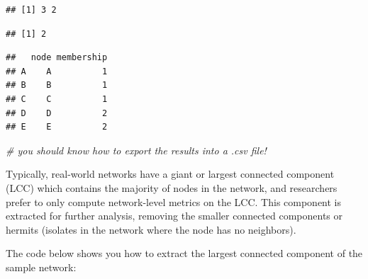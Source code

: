 \documentclass[
]{book}
\newenvironment{Shaded}{\begin{snugshade}}{\end{snugshade}}
\newcommand{\AttributeTok}[1]{\textcolor[rgb]{0.13,0.29,0.53}{#1}}
\newcommand{\CommentTok}[1]{\textcolor[rgb]{0.56,0.35,0.01}{\textit{#1}}}
\newcommand{\FunctionTok}[1]{\textcolor[rgb]{0.13,0.29,0.53}{\textbf{#1}}}
\newcommand{\NormalTok}[1]{#1}
\newcommand{\OtherTok}[1]{\textcolor[rgb]{0.56,0.35,0.01}{#1}}
\newcommand{\SpecialCharTok}[1]{\textcolor[rgb]{0.81,0.36,0.00}{\textbf{#1}}}
\begin{document}
\begin{verbatim}
## [1] 3 2
\end{verbatim}

\begin{Shaded}
\end{Shaded}

\begin{verbatim}
## [1] 2
\end{verbatim}

\begin{Shaded}
\end{Shaded}

\begin{verbatim}
##   node membership
## A    A          1
## B    B          1
## C    C          1
## D    D          2
## E    E          2
\end{verbatim}

\begin{Shaded}
\begin{Highlighting}[]
\CommentTok{\# you should know how to export the results into a .csv file! }
\end{Highlighting}
\end{Shaded}

Typically, real-world networks have a giant or largest connected component (LCC) which contains the majority of nodes in the network, and researchers prefer to only compute network-level metrics on the LCC. This component is extracted for further analysis, removing the smaller connected components or hermits (isolates in the network where the node has no neighbors).

The code below shows you how to extract the largest connected component of the sample network:

\begin{Shaded}
\end{Shaded}
\end{document}

